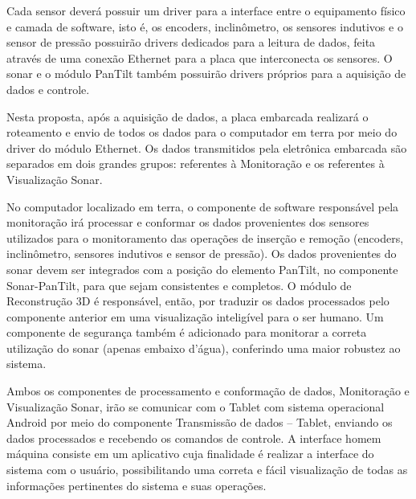 Cada sensor deverá possuir um driver para a interface entre o equipamento físico
e camada de software, isto é, os encoders, inclinômetro, os sensores indutivos e
o sensor de pressão possuirão drivers dedicados para a leitura de dados, feita
através de uma conexão Ethernet para a placa que interconecta os sensores. O
sonar e o módulo PanTilt também possuirão drivers próprios para a aquisição de
dados e controle.

Nesta proposta, após a aquisição de dados, a placa embarcada realizará o
roteamento e envio de todos os dados para o computador em terra por meio do
driver do módulo Ethernet.  Os dados transmitidos pela eletrônica embarcada são
separados em dois grandes grupos: referentes à Monitoração e os referentes à
Visualização Sonar.

No computador localizado em terra, o componente de software responsável pela
monitoração irá processar e conformar os dados provenientes dos sensores
utilizados para o monitoramento das operações de inserção e remoção (encoders,
inclinômetro, sensores indutivos e sensor de pressão). Os dados provenientes do
sonar devem ser integrados com a posição do elemento PanTilt, no componente
Sonar-PanTilt, para que sejam consistentes e completos.  O módulo de
Reconstrução 3D é responsável, então, por traduzir os dados processados pelo
componente anterior em uma visualização inteligível para o ser humano.  Um
componente de segurança também é adicionado para monitorar a correta utilização
do sonar (apenas embaixo d’água), conferindo uma maior robustez ao sistema.

Ambos os componentes de processamento e conformação de dados, Monitoração e
Visualização Sonar, irão se comunicar com o Tablet com sistema operacional
Android por meio do componente Transmissão de dados – Tablet, enviando os dados
processados e recebendo os comandos de controle.  A interface homem máquina
consiste em um aplicativo cuja finalidade é realizar a interface do sistema com
o usuário, possibilitando uma correta e fácil visualização de todas as
informações pertinentes do sistema e suas operações.

